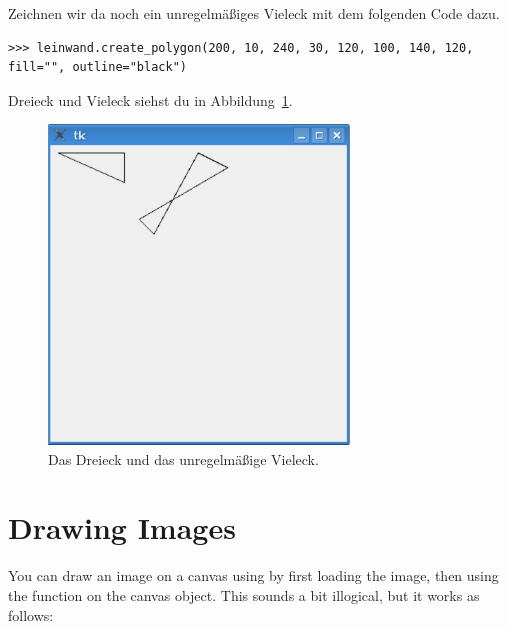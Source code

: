 Zeichnen wir da noch ein unregelmäßiges Vieleck mit dem folgenden Code dazu.

\begin{Verbatim}[frame=single]
>>> leinwand.create_polygon(200, 10, 240, 30, 120, 100, 140, 120, fill="", outline="black")
\end{Verbatim}

Dreieck und Vieleck siehst du in Abbildung~\ref{fig42}.

\begin{figure}
\begin{center}
\includegraphics[width=80mm]{images/figure42}
\end{center}
\caption{Das Dreieck und das unregelmäßige Vieleck.}\label{fig42}
\end{figure}

\section{Drawing Images}

You can draw an image on a canvas using  by first loading the image, then using the  function on the canvas object. This sounds a bit illogical, but it works as follows:

